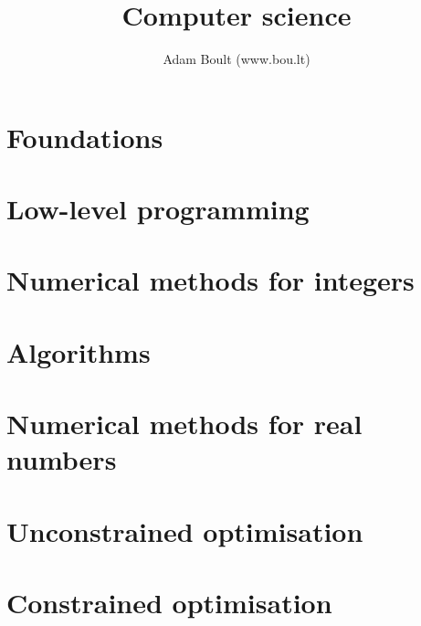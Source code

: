\documentclass[oneside]{book}
\begin{document}
\author{Adam Boult (www.bou.lt)}
\title{Computer science}
\maketitle

\setcounter{tocdepth}{0}
\tableofcontents



\part{Foundations}







\part{Low-level programming}




\part{Numerical methods for integers}




\part{Algorithms}





\part{Numerical methods for real numbers}














\part{Unconstrained optimisation}





\part{Constrained optimisation}

\end{document}

